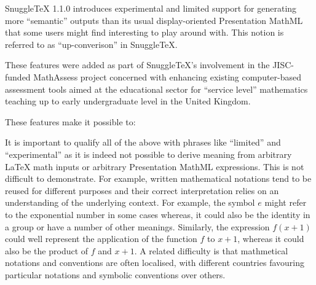 
SnuggleTeX 1.1.0 introduces experimental and limited support for generating
more ``semantic'' outputs than its usual display-oriented Presentation MathML
that some users might find interesting to play around with. This notion is
referred to as ``up-converison'' in SnuggleTeX.

These features were added as part of SnuggleTeX's involvement in the
JISC-funded MathAssess project concerned with enhancing existing computer-based
assessment tools aimed at the educational sector for ``service level''
mathematics teaching up to early undergraduate level in the United Kingdom.

These features make it possible to:


It is important to qualify all of the above with phrases like ``limited'' and ``experimental''
as it is indeed not possible to derive meaning from arbitrary LaTeX math inputs or arbitrary
Presentation MathML expressions. This is not difficult to demonstrate. For
example, written mathematical notations tend to be reused for different
purposes and their correct interpretation relies on an understanding of the
underlying context. For example, the symbol $e$ might refer to the exponential
number in some cases whereas, it could also be the identity in a group or have
a number of other meanings. Similarly, the expression $f(x+1)$ could well
represent the application of the function $f$ to $x+1$, whereas it could also
be the product of $f$ and $x+1$. A related difficulty is that mathmetical notations
and conventions are often localised, with different countries favouring particular
notations and symbolic conventions over others.

